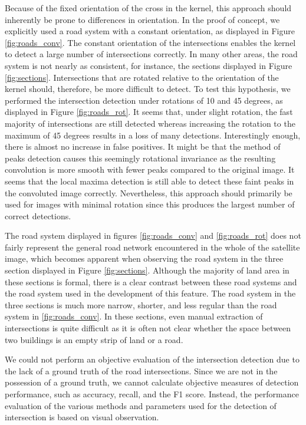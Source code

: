 \noindent
Because of the fixed orientation of the cross in the kernel, this approach should inherently be prone to differences in orientation. In the proof of concept, we explicitly used a road system with a constant orientation, as displayed in Figure \ref{fig:roads_conv}. The constant orientation of the intersections enables the kernel to detect a large number of intersections correctly. In many other areas, the road system is not nearly as consistent, for instance, the sections displayed in Figure \ref{fig:sections}. Intersections that are rotated relative to the orientation of the kernel should, therefore, be more difficult to detect. To test this hypothesis, we performed the intersection detection under rotations of 10 and 45 degrees, as displayed in Figure \ref{fig:roads_rot}. It seems that, under slight rotation, the fast majority of intersections are still detected whereas increasing the rotation to the maximum of 45 degrees results in a loss of many detections. Interestingly enough, there is almost no increase in false positives. It might be that the method of peaks detection causes this seemingly rotational invariance as the resulting convolution is more smooth with fewer peaks compared to the original image. It seems that the local maxima detection is still able to detect these faint peaks in the convoluted image correctly. Nevertheless, this approach should primarily be used for images with minimal rotation since this produces the largest number of correct detections.\newline

\noindent
The road system displayed in figures \ref{fig:roads_conv} and \ref{fig:roads_rot} does not fairly represent the general road network encountered in the whole of the satellite image, which becomes apparent when observing the road system in the three section displayed in Figure \ref{fig:sections}. Although the majority of land area in these sections is formal, there is a clear contrast between these road systems and the road system used in the development of this feature. The road system in the three sections is much more narrow, shorter, and less regular than the road system in \ref{fig:roads_conv}. In these sections, even manual extraction of intersections is quite difficult as it is often not clear whether the space between two buildings is an empty strip of land or a road. 

We could not perform an objective evaluation of the intersection detection due to the lack of a ground truth of the road intersections. Since we are not in the possession of a ground truth, we cannot calculate objective measures of detection performance, such as accuracy, recall, and the F1 score. Instead, the performance evaluation of the various methods and parameters used for the detection of intersection is based on visual observation.

